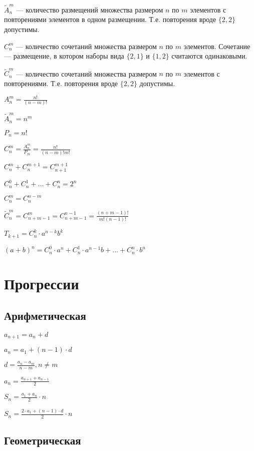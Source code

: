 $ \widetilde{A}^m_n $ --- количество размещений множества размером $ n $ по $ m $ элементов с повторениями элементов в одном размещении. Т.е. повторения вроде $ \{2, 2\} $ допустимы.

$ C^m_n $ --- количество сочетаний множества размером $n$ по $m$ элементов. Сочетание --- размещение, в котором наборы вида $ \{2, 1 \} $ и $ \{ 1, 2 \} $ считаются одинаковыми.

$ \widetilde{C}^m_n $ --- количество сочетаний множества размером $n$ по $m$ элементов с повторениями. Т.е. повторения вроде $ \{2, 2\} $ допустимы.

$ A^m_n = \frac{n!}{(n-m)!} $

$ \widetilde{A}^m_n = n^m $

$ P_n = n! $

$ C^m_n = \frac{A^m_n}{P_m} = \frac{n!}{(n-m)!m!} $

$ C^m_n + C^{m+1}_n = C^{m+1}_{n+1} $

$ C^0_n + C^1_n + \dots + C^n_n = 2^n $

$ C^m_n = C^{n-m}_n $

$ \widetilde{C}^m_n = C^m_{n+m-1} = C^{n-1}_{n+m-1} = \frac{(n+m-1)!}{m!(n-1)!} $

$ T_{k+1} = C^k_n\cdot a^{n-k}b^k $

$ (a+b)^n = C^0_n\cdot a^n + C^1_n\cdot a^{n-1}b + \dots + C^n_n\cdot b^n $

	
\section{Прогрессии}

\subsection{Арифметическая}

$ a_{n+1} = a_n + d $

$ a_n = a_1 + (n-1)\cdot d $

$ d = \frac{a_n-a_m}{n-m}, n \neq m $

$ a_n = \frac{a_{n+1} + a_{n-1}}{2} $

$ S_n = \frac{a_1 + a_n}{2}\cdot n $

$ S_n = \frac{2\cdot a_1 + (n-1)\cdot d}{2}\cdot n $

\subsection{Геометрическая}

